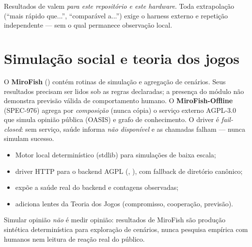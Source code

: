 \begin{aviso}
Resultados de  valem \emph{para este repositório e este
hardware}. Toda extrapolação (``mais rápido que...'', ``comparável a...'') exige o
harness externo e repetição independente — sem o qual permanece observação local.
\end{aviso}

\clearpage
\section{Simulação social e teoria dos jogos}


\begin{descricao}
O \textbf{MiroFish} () contém rotinas de simulação e agregação
de cenários. Seus resultados precisam ser lidos sob as regras declaradas;
a presença do módulo não demonstra previsão válida de comportamento humano.
O \textbf{MiroFish-Offline} (SPEC-976) agrega por
\emph{composição} (nunca cópia) o serviço externo AGPL-3.0 que simula opinião
pública (OASIS) e grafo de conhecimento. O driver
 é \emph{fail-closed}: sem serviço, saúde
informa \emph{não disponível} e as chamadas falham — nunca simulam sucesso.
\end{descricao}

\begin{arquitetura}
\begin{itemize}[leftmargin=1.3em,itemsep=1pt]
  \item Motor local determinístico (stdlib) para simulações de baixa escala;
  \item driver HTTP para o backend AGPL (,
         ), com fallback de diretório canônico;
  \item {} expõe a
        saúde real do backend e contagens observadas;
  \item {} adiciona lentes da Teoria dos Jogos (compromisso,
        cooperação, previsão).
\end{itemize}
\end{arquitetura}

\begin{limite}
Simular opinião \emph{não} é medir opinião: resultados de MiroFish são produção
sintética determinística para exploração de cenários, nunca pesquisa empírica com
humanos nem leitura de reação real do público.
\end{limite}

